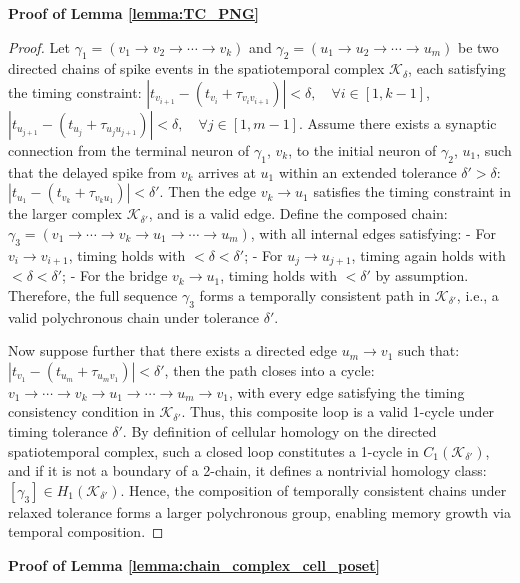 \documentclass[lettersize,journal]{IEEEtran}
\begin{document}
\noindent\textbf{Proof of Lemma \ref{lemma:TC_PNG}}

\begin{proof}
Let \( \gamma_1 = (v_1 \to v_2 \to \cdots \to v_k) \) and \( \gamma_2 = (u_1 \to u_2 \to \cdots \to u_m) \) be two directed chains of spike events in the spatiotemporal complex \( \mathcal{K}_\delta \), each satisfying the timing constraint:
$|t_{v_{i+1}} - (t_{v_i} + \tau_{v_i v_{i+1}})| < \delta, \quad \forall i \in [1, k-1]$,
$|t_{u_{j+1}} - (t_{u_j} + \tau_{u_j u_{j+1}})| < \delta, \quad \forall j \in [1, m-1]$.
Assume there exists a synaptic connection from the terminal neuron of \( \gamma_1 \), \( v_k \), to the initial neuron of \( \gamma_2 \), \( u_1 \), such that the delayed spike from \( v_k \) arrives at \( u_1 \) within an extended tolerance \( \delta' > \delta \):
$|t_{u_1} - (t_{v_k} + \tau_{v_k u_1})| < \delta'$.
Then the edge \( v_k \to u_1 \) satisfies the timing constraint in the larger complex \( \mathcal{K}_{\delta'} \), and is a valid edge.
Define the composed chain:
$\gamma_3 = (v_1 \to \cdots \to v_k \to u_1 \to \cdots \to u_m)$,
with all internal edges satisfying:
- For \( v_i \to v_{i+1} \), timing holds with \( < \delta < \delta' \);
- For \( u_j \to u_{j+1} \), timing again holds with \( < \delta < \delta' \);
- For the bridge \( v_k \to u_1 \), timing holds with \( < \delta' \) by assumption.
Therefore, the full sequence \( \gamma_3 \) forms a temporally consistent path in \( \mathcal{K}_{\delta'} \), i.e., a valid polychronous chain under tolerance \( \delta' \).

Now suppose further that there exists a directed edge \( u_m \to v_1 \) such that:
$|t_{v_1} - (t_{u_m} + \tau_{u_m v_1})| < \delta'$,
then the path closes into a cycle:
$v_1 \to \cdots \to v_k \to u_1 \to \cdots \to u_m \to v_1$,
with every edge satisfying the timing consistency condition in \( \mathcal{K}_{\delta'} \). Thus, this composite loop is a valid 1-cycle under timing tolerance \( \delta' \).
By definition of cellular homology on the directed spatiotemporal complex, such a closed loop constitutes a 1-cycle in \( C_1(\mathcal{K}_{\delta'}) \), and if it is not a boundary of a 2-chain, it defines a nontrivial homology class:
$[\gamma_3] \in H_1(\mathcal{K}_{\delta'})$.
Hence, the composition of temporally consistent chains under relaxed tolerance forms a larger polychronous group, enabling memory growth via temporal composition.
\end{proof}



\noindent\textbf{Proof of Lemma \ref{lemma:chain_complex_cell_poset}}
\end{document}
